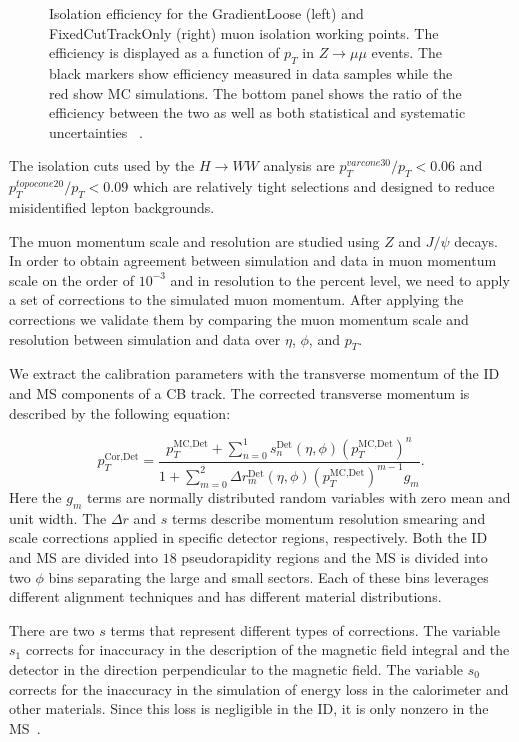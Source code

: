 \begin{figure}[!h]
\begin{minipage}[b]{0.48\textwidth}
  \end{minipage}
  \caption{Isolation efficiency for the GradientLoose (left) and FixedCutTrackOnly (right) muon isolation working points. The efficiency is displayed as a function of $p_T$ in $Z \rightarrow \mu\mu$ events. The black markers show efficiency measured in data samples while the red show MC simulations. The bottom panel shows the ratio of the efficiency between the two as well as both statistical and systematic uncertainties ~\cite{MCPPlots2}.}
  \label{fig:isolation}
\end{figure}

The isolation cuts used by the $H\rightarrow WW$ analysis are $p_T^{varcone30}/p_T<0.06$ and $p_T^{topocone20}/p_T<0.09$ which are relatively tight selections and designed to reduce misidentified lepton backgrounds. 

The muon momentum scale and resolution are studied using $Z$ and $J/\psi$ decays. In order to obtain agreement between simulation and data in muon momentum scale on the order of $10^{-3}$ and in resolution to the percent level, we need to apply a set of corrections to the simulated muon momentum. After applying the corrections we validate them by comparing the muon momentum scale and resolution between simulation and data over $\eta$, $\phi$, and $p_T$.

We extract the calibration parameters with the transverse momentum of the ID and MS components of a CB track.  The corrected transverse momentum is described by the following equation: 

\begin{equation}
    p_T^{\textrm{Cor,Det}} = \frac{p_T^{\textrm{MC,Det}}+\sum\limits_{n=0}^1s_n^{\textrm{Det}}(\eta,\phi)(p_T^{\textrm{MC,Det}})^n}{1+\sum\limits_{m=0}^2\Delta r_m^{\textrm{Det}}(\eta,\phi)(p_T^{\textrm{MC,Det}})^{m-1}g_m} .
\end{equation}
Here the $g_m$ terms are normally distributed random variables with zero mean and unit width. The $\Delta r $ and $s$ terms describe momentum resolution smearing and scale corrections applied in specific detector regions, respectively. Both the ID and MS are divided into $18$ pseudorapidity regions and the MS is divided into two $\phi$ bins separating the large and small sectors. Each of these bins leverages different alignment techniques and has different material distributions. 

There are two $s$ terms that represent different types of corrections. The variable $s_1$ corrects for inaccuracy in the description of the magnetic field integral and the detector in the direction perpendicular to the magnetic field. The variable $s_0$ corrects for the inaccuracy in the simulation of energy loss in the calorimeter and other materials. Since this loss is negligible in the ID, it is only nonzero in the MS~\cite{MCPpaper}.

